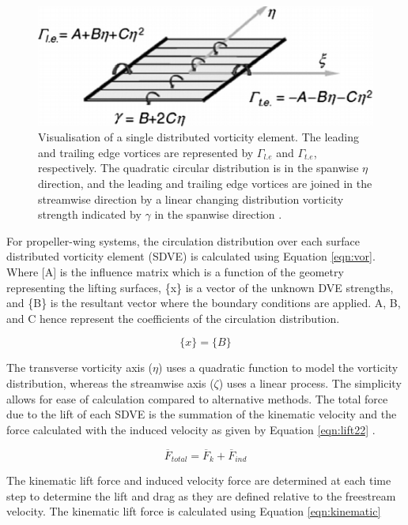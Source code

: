 \begin{figure}
\centering
\includegraphics[width=0.7\linewidth]{04_Methodology/Figs/votex.png}
\caption{Visualisation of a single distributed vorticity element. The leading and trailing edge vortices are represented by $\Gamma_{l.e}$ and $\Gamma_{t.e}$, respectively. The quadratic circular distribution is in the spanwise $\eta$ direction, and the leading and trailing edge vortices are joined in the streamwise direction by a linear changing distribution vorticity strength indicated by $\gamma$ in the spanwise direction \cite{Cole2019}.}
\label{fig:Votices}
\end{figure}

For propeller-wing systems, the circulation distribution over each surface distributed vorticity element (\acrshort{SDVE}) is calculated using Equation \ref{eqn:vor}. Where [A] is the influence matrix which is a function of the geometry representing the lifting surfaces, \{x\} is a vector of the unknown DVE strengths, and \{B\} is the resultant vector where the boundary conditions are applied. A, B, and C hence represent the coefficients of the circulation distribution.

\begin{equation}
[A]\{x\} = \{B\}
\label{eqn:vor}
\end{equation}

The transverse vorticity axis ($\eta$) uses a quadratic function to model the vorticity distribution, whereas the streamwise axis ($\zeta$) uses a linear process. The simplicity allows for ease of calculation compared to alternative methods. The total force due to the lift of each \acrshort{SDVE} is the summation of the kinematic velocity and the force calculated with the induced velocity as given by Equation \ref{eqn:lift22} \cite{Cole2019}.

\begin{equation}
{\overline{F}}_{total} = \overline{F}_k + \overline{F}_{ind}
\label{eqn:lift22}
\end{equation}

The kinematic lift force and induced velocity force are determined at each time step to determine the lift and drag as they are defined relative to the freestream velocity. The kinematic lift force is calculated using Equation \ref{eqn:kinematic}

